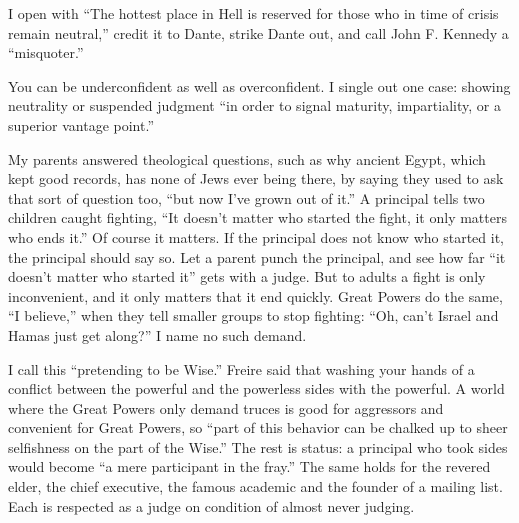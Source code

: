 
I open with ``The hottest place in Hell is reserved for those who in time of crisis remain neutral,'' credit it to Dante, strike Dante out, and call John F. Kennedy a ``misquoter.'' 

You can be underconfident as well as overconfident. I single out one case: showing neutrality or suspended judgment ``in order to signal maturity, impartiality, or a superior vantage point.''

My parents answered theological questions, such as why ancient Egypt, which kept good records, has none of Jews ever being there, by saying they used to ask that sort of question too, ``but now I've grown out of it.''  A principal tells two children caught fighting, ``It doesn't matter who started the fight, it only matters who ends it.'' Of course it matters. If the principal does not know who started it, the principal should say so. Let a parent punch the principal, and see how far ``it doesn't matter who started it'' gets with a judge. But to adults a fight is only inconvenient, and it only matters that it end quickly.  Great Powers do the same, ``I believe,'' when they tell smaller groups to stop fighting: ``Oh, can't Israel and Hamas just get along?'' I name no such demand. 

I call this ``pretending to be Wise.'' Freire said that washing your hands of a conflict between the powerful and the powerless sides with the powerful. A world where the Great Powers only demand truces is good for aggressors and convenient for Great Powers, so ``part of this behavior can be chalked up to sheer selfishness on the part of the Wise.'' The rest is status: a principal who took sides would become ``a mere participant in the fray.'' The same holds for the revered elder, the chief executive, the famous academic and the founder of a mailing list. Each is respected as a judge on condition of almost never judging. 

